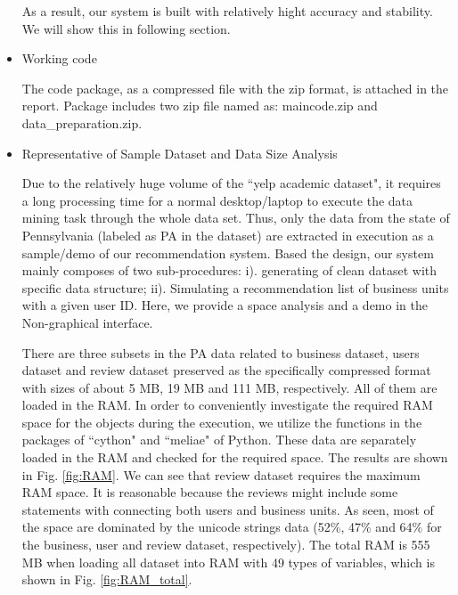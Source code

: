 \begin{itemize}
\par
As a result, our system is built with relatively hight accuracy and stability. We will show this in following section.
 
\item{Working code}

The code package, as a compressed file with the zip format, is attached in the report. Package includes two zip file named as: maincode.zip and data\_preparation.zip.

\item{Representative of Sample Dataset and Data Size Analysis}
\par
Due to the relatively huge volume of the ``yelp academic dataset", it requires a long processing time for a normal desktop/laptop to execute the data mining task through the whole data set. Thus, only the data from the state of Pennsylvania (labeled as PA in the dataset) are extracted in execution as a sample/demo of our recommendation system. Based the design, our system mainly composes of two sub-procedures: i). generating of clean dataset with specific data structure; ii). Simulating a recommendation list of business units with a given user ID. Here, we provide a space analysis and a demo in the Non-graphical interface.

\par
There are three subsets in the PA data related to business dataset, users dataset and review dataset preserved as the specifically compressed format with sizes of about 5 MB, 19 MB and 111 MB, respectively. All of them are loaded in the RAM. In order to conveniently investigate the required RAM space for the objects during the execution, we utilize the functions in the packages of ``cython" and ``meliae" of Python. These data are separately loaded in the RAM and checked for the required space. The results are shown in Fig. \ref{fig:RAM}. We can see that review dataset requires the maximum RAM space. It is reasonable because the reviews might include some statements with connecting both users and business units. As seen, most of the space are dominated by the unicode strings data (52\%, 47\% and 64\% for the business, user and review dataset, respectively). The total RAM is 555 MB when loading all dataset into RAM with 49 types of variables, which is shown in Fig. \ref{fig:RAM_total}.


\end{itemize}
